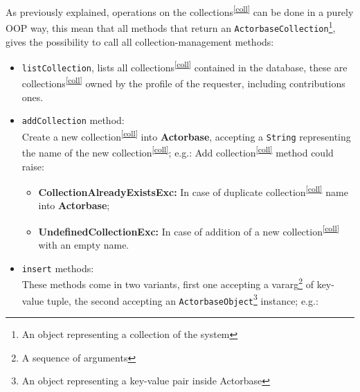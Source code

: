 \documentclass{scalatekids-article}
\begin{document}
As previously explained, operations on the collections\textsuperscript{\ref{coll}} can be done in a purely
OOP way, this mean that all methods that return an \verb=ActorbaseCollection=\footnote{An object representing a collection of the system\label{ABcoll}},
gives the possibility to call all collection-management methods:

\begin{itemize}
\item \verb=listCollection=, lists all collections\textsuperscript{\ref{coll}}
  contained in the database, these are collections\textsuperscript{\ref{coll}}
  owned by the profile of the requester, including contributions ones.
\item \verb=addCollection= method:\\ Create a new collection\textsuperscript{\ref{coll}} into \textbf{Actorbase}, accepting a \verb=String=
  representing the name of the new collection\textsuperscript{\ref{coll}};
  e.g.:
  Add collection\textsuperscript{\ref{coll}} method could raise:
  \begin{itemize}
  \item \textbf{CollectionAlreadyExistsExc:} In case of duplicate collection\textsuperscript{\ref{coll}} name into \textbf{Actorbase};
  \item \textbf{UndefinedCollectionExc:} In case of addition of a new collection\textsuperscript{\ref{coll}} with an empty name.
  \end{itemize}
\item \verb=insert= methods:\\ These methods come in two variants, first one accepting
  a vararg\footnote{A sequence of arguments} of key-value tuple, the second
  accepting an
  \verb=ActorbaseObject=\footnote{An object representing a key-value pair inside Actorbase\label{ABobj}} instance;
  e.g.:

\end{itemize}
\end{document}
